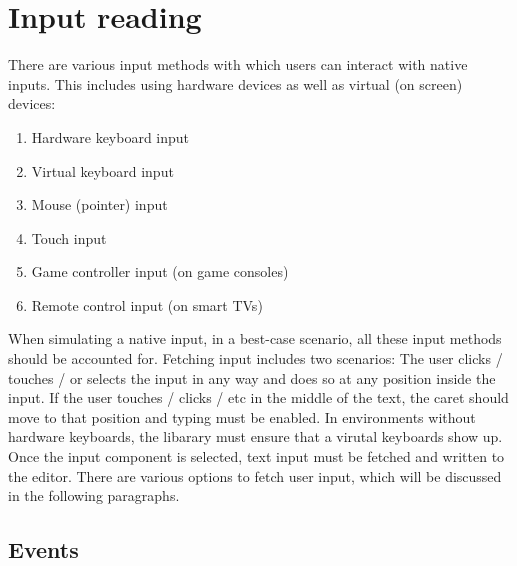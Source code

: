 



\section{Input reading}

There are various input methods with which users can interact with native inputs. This includes using hardware devices as well as virtual (on screen) devices:

\begin{enumerate} 
\item Hardware keyboard input
\item Virtual keyboard input
\item Mouse (pointer) input
\item Touch input
\item Game controller input (on game consoles)
\item Remote control input (on smart TVs)
\end{enumerate}

When simulating a native input, in a best-case scenario, all these input methods should be accounted for. Fetching input includes two scenarios: The user clicks / touches / or selects the input in any way and does so at any position inside the input. If the user touches / clicks / etc in the middle of the text, the caret should move to that position and typing must be enabled. In environments without hardware keyboards, the libarary must ensure that a virutal keyboards show up. Once the input component is selected, text input must be fetched and written to the editor. There are various options to fetch user input, which will be discussed in the following paragraphs.

\subsection{Events} 

